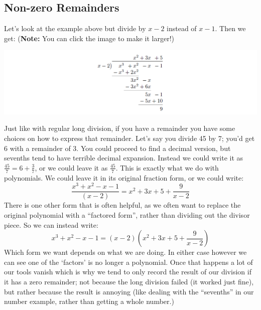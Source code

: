 \documentclass{ximera}
\begin{document}
    
    \subsection*{Non-zero Remainders}
    
    Let's look at the example above but divide by $x-2$ instead of $x-1$. Then we get: \iftikzexport(\textbf{Note:} You can click the image to make it larger!)\fi
    
    \begin{image}
        \includegraphics[width=\textwidth]{exPolyLongDivisionTwo.png}
    \end{image}
    
    
    Just like with regular long division, if you have a remainder you have some choices on how to express that remainder. Let's say you divide  45 by 7; you'd get 6 with a remainder of 3. You could proceed to find a decimal version, but sevenths tend to have terrible decimal expansion. Instead we could write it as $\frac{45}{7} = 6 + \frac{3}{7}$, or we could leave it as $\frac{45}{7}$. This is exactly what we do with polynomials. We could leave it in its original fraction form, or we could write:
    \[
        \frac{x^3 + x^2 - x - 1}{(x - 2)} = x^2 + 3x + 5 + \dfrac{9}{x-2}
    \]
    There is one other form that is often helpful, as we often want to replace the original polynomial with a ``factored form'', rather than dividing out the divisor piece. So we can instead write:
    \[
    x^3 + x^2 - x - 1 = (x - 2)\left(x^2 + 3x + 5 + \dfrac{9}{x-2}\right)
    \]
    Which form we want depends on what we are doing. In either case however we can see one of the `factors' is no longer a polynomial. Once that happens a lot of our tools vanish which is why we tend to only record the result of our division if it has a zero remainder; not because the long division failed (it worked just fine), but rather because the result is annoying (like dealing with the ``sevenths'' in our number example, rather than getting a whole number.)
\end{document}

